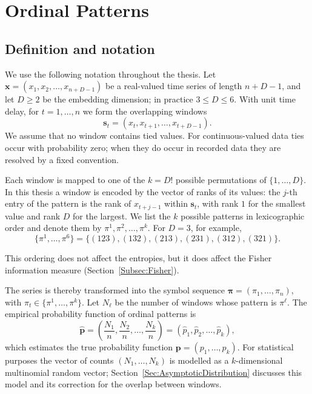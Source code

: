 \section{Ordinal Patterns}\label{Sec:OrdinalPatterns}

\subsection{Definition and notation}\label{Subsec:Notation}

We use the following notation throughout the thesis. Let $\mathbf{x}=(x_1,x_2,\dots,x_{n+D-1})$ be a real-valued time series of length $n+D-1$, and let $D\geq 2$ be the embedding dimension; in practice $3\leq D\leq 6$. With unit time delay, for $t=1,\dots,n$ we form the overlapping windows
\[
\mathbf{s}_t=(x_t,x_{t+1},\dots,x_{t+D-1}).
\]
We assume that no window contains tied values. For continuous-valued data ties occur with probability zero; when they do occur in recorded data they are resolved by a fixed convention.

Each window is mapped to one of the $k=D!$ possible permutations of $\{1,\dots,D\}$. In this thesis a window is encoded by the vector of ranks of its values: the $j$-th entry of the pattern is the rank of $x_{t+j-1}$ within $\mathbf{s}_t$, with rank $1$ for the smallest value and rank $D$ for the largest. We list the $k$ possible patterns in lexicographic order and denote them by $\pi^1,\pi^2,\dots,\pi^k$. For $D=3$, for example,
\[
\{\pi^1,\dots,\pi^6\}=\{(123),(132),(213),(231),(312),(321)\}.
\]

This ordering does not affect the entropies, but it does affect the Fisher information measure (Section~\ref{Subsec:Fisher}).

The series is thereby transformed into the symbol sequence $\boldsymbol{\pi}=(\pi_1,\dots,\pi_n)$, with $\pi_t\in\{\pi^1,\dots,\pi^k\}$. Let $N_\ell$ be the number of windows whose pattern is $\pi^\ell$. The empirical probability function of ordinal patterns is
\begin{equation}
	\widehat{\mathbf{p}}=\left(\frac{N_1}{n},\frac{N_2}{n},\dots,\frac{N_k}{n}\right)=(\widehat{p}_1,\widehat{p}_2,\dots,\widehat{p}_k),
	\label{eq:EmpiricalP}
\end{equation}
which estimates the true probability function $\mathbf{p}=(p_1,\dots,p_k)$. For statistical purposes the vector of counts $(N_1,\dots,N_k)$ is modelled as a $k$-dimensional multinomial random vector; Section~\ref{Sec:AsymptoticDistribution} discusses this model and its correction for the overlap between windows.

